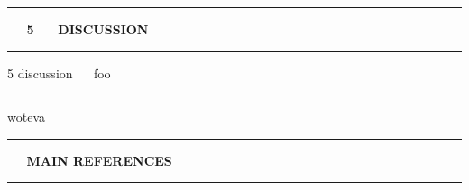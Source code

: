 \documentclass[11pt, compress, t, notes = noshow, xcolor = table, 
aspectratio = 1610]{beamer}
\newcommand{\highlight}[1]{\textcolor{highlightcol}{\textbf{#1}}}
\begin{document}

\LARGE
\begin{frame}{\phantom{foo}}
\normalsize
\vspace{-0.5cm}
\noindent \textcolor{gray!90}{\rule{\textwidth}{1pt}}
\smallskip

\Huge
\hspace{0pt}
\vfill
\textbf{\highlight{~~ 5 ~~ DISCUSSION}}
\vfill
\hspace{0pt}

\noindent \textcolor{gray!90}{\rule{\textwidth}{1pt}}

\end{frame}


\LARGE
\begin{frame}{\textcolor{gray!90}{5 discussion} ~~ foo}
\normalsize
\vspace{-0.5cm}
\noindent \textcolor{gray!90}{\rule{\textwidth}{1pt}}


\medskip

woteva

\end{frame}


\LARGE
\begin{frame}{\phantom{foo}}
\normalsize
\vspace{-0.5cm}
\noindent \textcolor{gray!90}{\rule{\textwidth}{1pt}}
\smallskip

\Huge
\hspace{0pt}
\vfill
\textbf{\highlight{~~ MAIN REFERENCES}}
\vfill
\hspace{0pt}

\noindent \textcolor{gray!90}{\rule{\textwidth}{1pt}}

\end{frame}


\begin{frame}{}
\footnotesize




\end{frame}


\endlecture
\end{document}
